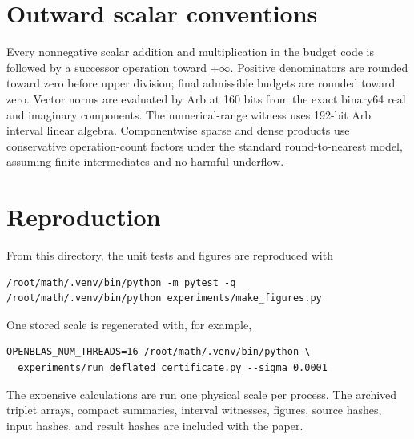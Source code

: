 \documentclass[11pt]{article}
\theoremstyle{definition}
\theoremstyle{remark}
\begin{document}
\appendix

\section{Outward scalar conventions}
\label{app:rounding}

Every nonnegative scalar addition and multiplication in the budget code is
followed by a successor operation toward $+\infty$.  Positive denominators
are rounded toward zero before upper division; final admissible budgets are
rounded toward zero.  Vector norms are evaluated by Arb at 160 bits from the
exact binary64 real and imaginary components.  The numerical-range witness
uses 192-bit Arb interval linear algebra.  Componentwise sparse and dense
products use conservative operation-count factors under the standard
round-to-nearest model, assuming finite intermediates and no harmful
underflow.

\section{Reproduction}
\label{app:reproduction}

From this directory, the unit tests and figures are reproduced with
\begin{verbatim}
/root/math/.venv/bin/python -m pytest -q
/root/math/.venv/bin/python experiments/make_figures.py
\end{verbatim}
One stored scale is regenerated with, for example,
\begin{verbatim}
OPENBLAS_NUM_THREADS=16 /root/math/.venv/bin/python \
  experiments/run_deflated_certificate.py --sigma 0.0001
\end{verbatim}
The expensive calculations are run one physical scale per process.  The
archived triplet arrays, compact summaries, interval witnesses, figures,
source hashes, input hashes, and result hashes are included with the paper.



\end{document}
